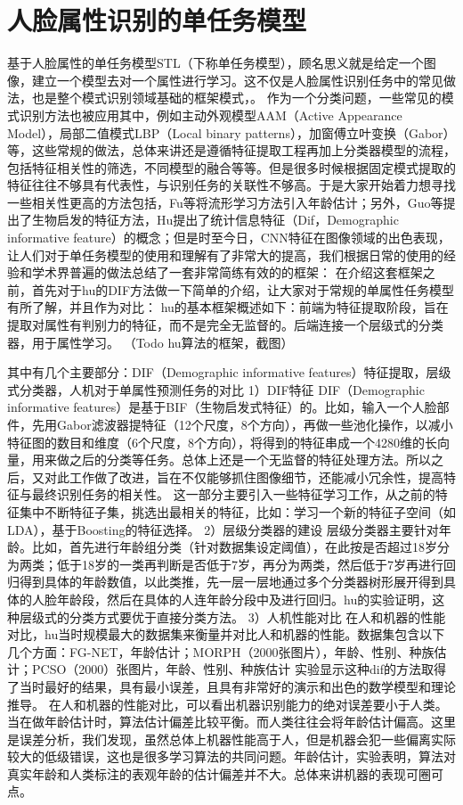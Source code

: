 \section{人脸属性识别的单任务模型}
基于人脸属性的单任务模型STL（下称单任务模型），顾名思义就是给定一个图像，建立一个模型去对一个属性进行学习。这不仅是人脸属性识别任务中的常见做法，也是整个模式识别领域基础的框架模式，。
作为一个分类问题，一些常见的模式识别方法也被应用其中，例如主动外观模型AAM（Active  Appearance  Model），局部二值模式LBP（Local binary patterns），加窗傅立叶变换（Gabor）等，这些常规的做法，总体来讲还是遵循特征提取工程再加上分类器模型的流程，包括特征相关性的筛选，不同模型的融合等等。但是很多时候根据固定模式提取的特征往往不够具有代表性，与识别任务的关联性不够高。于是大家开始着力想寻找一些相关性更高的方法包括，Fu等将流形学习方法引入年龄估计；另外，Guo等提出了生物启发的特征方法，Hu提出了统计信息特征（Dif，Demographic informative feature）的概念；但是时至今日，CNN特征在图像领域的出色表现，让人们对于单任务模型的使用和理解有了非常大的提高，我们根据日常的使用的经验和学术界普遍的做法总结了一套非常简练有效的的框架：
在介绍这套框架之前，首先对于hu的DIF方法做一下简单的介绍，让大家对于常规的单属性任务模型有所了解，并且作为对比：
hu的基本框架概述如下：前端为特征提取阶段，旨在提取对属性有判别力的特征，而不是完全无监督的。后端连接一个层级式的分类器，用于属性学习。
（Todo hu算法的框架，截图）

其中有几个主要部分：DIF（Demographic informative features）特征提取，层级式分类器，人机对于单属性预测任务的对比
1）DIF特征
DIF（Demographic informative features）是基于BIF（生物启发式特征）的。比如，输入一个人脸部件，先用Gabor滤波器提特征（12个尺度，8个方向），再做一些池化操作，以减小特征图的数目和维度（6个尺度，8个方向），将得到的特征串成一个4280维的长向量，用来做之后的分类等任务。总体上还是一个无监督的特征处理方法。所以之后，又对此工作做了改进，旨在不仅能够抓住图像细节，还能减小冗余性，提高特征与最终识别任务的相关性。
这一部分主要引入一些特征学习工作，从之前的特征集中不断特征子集，挑选出最相关的特征，比如：学习一个新的特征子空间（如LDA），基于Boosting的特征选择。
2）层级分类器的建设
层级分类器主要针对年龄。比如，首先进行年龄组分类（针对数据集设定阈值），在此按是否超过18岁分为两类；低于18岁的一类再判断是否低于7岁，再分为两类，然后低于7岁再进行回归得到具体的年龄数值，以此类推，先一层一层地通过多个分类器树形展开得到具体的人脸年龄段，然后在具体的人连年龄分段中及进行回归。hu的实验证明，这种层级式的分类方式要优于直接分类方法。
3）人机性能对比
在人和机器的性能对比，hu当时规模最大的数据集来衡量并对比人和机器的性能。数据集包含以下几个方面：FG-NET，年龄估计；MORPH（2000张图片），年龄、性别、种族估计；PCSO（2000）张图片，年龄、性别、种族估计
实验显示这种dif的方法取得了当时最好的结果，具有最小误差，且具有非常好的演示和出色的数学模型和理论推导。
在人和机器的性能对比，可以看出机器识别能力的绝对误差要小于人类。当在做年龄估计时，算法估计偏差比较平衡。而人类往往会将年龄估计偏高。这里是误差分析，我们发现，虽然总体上机器性能高于人，但是机器会犯一些偏离实际较大的低级错误，这也是很多学习算法的共同问题。年龄估计，实验表明，算法对真实年龄和人类标注的表观年龄的估计偏差并不大。总体来讲机器的表现可圈可点。

